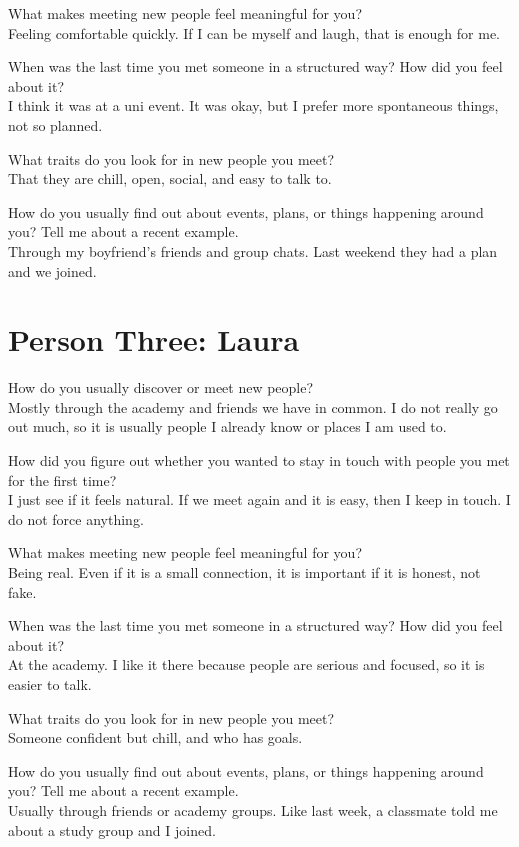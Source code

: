 \documentclass[11pt]{article}
\begin{document}
What makes meeting new people feel meaningful for you?\\
Feeling comfortable quickly. If I can be myself and laugh, that is enough for me.

When was the last time you met someone in a structured way? How did you feel about it?\\
I think it was at a uni event. It was okay, but I prefer more spontaneous things, not so planned.

What traits do you look for in new people you meet?\\
That they are chill, open, social, and easy to talk to.

How do you usually find out about events, plans, or things happening around you? Tell me about a recent example.\\
Through my boyfriend's friends and group chats. Last weekend they had a plan and we joined.

\section*{Person Three: Laura}
How do you usually discover or meet new people?\\
Mostly through the academy and friends we have in common. I do not really go out much, so it is usually people I already know or places I am used to.

How did you figure out whether you wanted to stay in touch with people you met for the first time?\\
I just see if it feels natural. If we meet again and it is easy, then I keep in touch. I do not force anything.

What makes meeting new people feel meaningful for you?\\
Being real. Even if it is a small connection, it is important if it is honest, not fake.

When was the last time you met someone in a structured way? How did you feel about it?\\
At the academy. I like it there because people are serious and focused, so it is easier to talk.

What traits do you look for in new people you meet?\\
Someone confident but chill, and who has goals.

How do you usually find out about events, plans, or things happening around you? Tell me about a recent example.\\
Usually through friends or academy groups. Like last week, a classmate told me about a study group and I joined.
\end{document}
